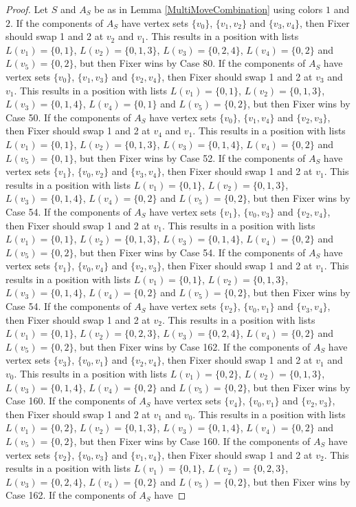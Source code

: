 \documentclass[12pt]{amsart}
\theoremstyle{plain}
\theoremstyle{definition}
\theoremstyle{remark}
\begin{document}
\begin{proof}
Let $S$ and $A_S$ be as in Lemma \ref{MultiMoveCombination} using colors $1$ and $2$. If the components of $A_S$ have vertex sets $\{v_0\}$, $\{v_1, v_2\}$ and $\{v_3, v_4\}$, then Fixer should swap 1 and 2 at $v_2$ and $v_1$. This results in a position with lists $L(v_1) = \{0, 1\}$, $L(v_2) = \{0, 1, 3\}$, $L(v_3) = \{0, 2, 4\}$, $L(v_4) = \{0, 2\}$ and $L(v_5) = \{0, 2\}$, but then Fixer wins by Case 80. If the components of $A_S$ have vertex sets $\{v_0\}$, $\{v_1, v_3\}$ and $\{v_2, v_4\}$, then Fixer should swap 1 and 2 at $v_3$ and $v_1$. This results in a position with lists $L(v_1) = \{0, 1\}$, $L(v_2) = \{0, 1, 3\}$, $L(v_3) = \{0, 1, 4\}$, $L(v_4) = \{0, 1\}$ and $L(v_5) = \{0, 2\}$, but then Fixer wins by Case 50. If the components of $A_S$ have vertex sets $\{v_0\}$, $\{v_1, v_4\}$ and $\{v_2, v_3\}$, then Fixer should swap 1 and 2 at $v_4$ and $v_1$. This results in a position with lists $L(v_1) = \{0, 1\}$, $L(v_2) = \{0, 1, 3\}$, $L(v_3) = \{0, 1, 4\}$, $L(v_4) = \{0, 2\}$ and $L(v_5) = \{0, 1\}$, but then Fixer wins by Case 52. If the components of $A_S$ have vertex sets $\{v_1\}$, $\{v_0, v_2\}$ and $\{v_3, v_4\}$, then Fixer should swap 1 and 2 at $v_1$. This results in a position with lists $L(v_1) = \{0, 1\}$, $L(v_2) = \{0, 1, 3\}$, $L(v_3) = \{0, 1, 4\}$, $L(v_4) = \{0, 2\}$ and $L(v_5) = \{0, 2\}$, but then Fixer wins by Case 54. If the components of $A_S$ have vertex sets $\{v_1\}$, $\{v_0, v_3\}$ and $\{v_2, v_4\}$, then Fixer should swap 1 and 2 at $v_1$. This results in a position with lists $L(v_1) = \{0, 1\}$, $L(v_2) = \{0, 1, 3\}$, $L(v_3) = \{0, 1, 4\}$, $L(v_4) = \{0, 2\}$ and $L(v_5) = \{0, 2\}$, but then Fixer wins by Case 54. If the components of $A_S$ have vertex sets $\{v_1\}$, $\{v_0, v_4\}$ and $\{v_2, v_3\}$, then Fixer should swap 1 and 2 at $v_1$. This results in a position with lists $L(v_1) = \{0, 1\}$, $L(v_2) = \{0, 1, 3\}$, $L(v_3) = \{0, 1, 4\}$, $L(v_4) = \{0, 2\}$ and $L(v_5) = \{0, 2\}$, but then Fixer wins by Case 54. If the components of $A_S$ have vertex sets $\{v_2\}$, $\{v_0, v_1\}$ and $\{v_3, v_4\}$, then Fixer should swap 1 and 2 at $v_2$. This results in a position with lists $L(v_1) = \{0, 1\}$, $L(v_2) = \{0, 2, 3\}$, $L(v_3) = \{0, 2, 4\}$, $L(v_4) = \{0, 2\}$ and $L(v_5) = \{0, 2\}$, but then Fixer wins by Case 162. If the components of $A_S$ have vertex sets $\{v_3\}$, $\{v_0, v_1\}$ and $\{v_2, v_4\}$, then Fixer should swap 1 and 2 at $v_1$ and $v_0$. This results in a position with lists $L(v_1) = \{0, 2\}$, $L(v_2) = \{0, 1, 3\}$, $L(v_3) = \{0, 1, 4\}$, $L(v_4) = \{0, 2\}$ and $L(v_5) = \{0, 2\}$, but then Fixer wins by Case 160. If the components of $A_S$ have vertex sets $\{v_4\}$, $\{v_0, v_1\}$ and $\{v_2, v_3\}$, then Fixer should swap 1 and 2 at $v_1$ and $v_0$. This results in a position with lists $L(v_1) = \{0, 2\}$, $L(v_2) = \{0, 1, 3\}$, $L(v_3) = \{0, 1, 4\}$, $L(v_4) = \{0, 2\}$ and $L(v_5) = \{0, 2\}$, but then Fixer wins by Case 160. If the components of $A_S$ have vertex sets $\{v_2\}$, $\{v_0, v_3\}$ and $\{v_1, v_4\}$, then Fixer should swap 1 and 2 at $v_2$. This results in a position with lists $L(v_1) = \{0, 1\}$, $L(v_2) = \{0, 2, 3\}$, $L(v_3) = \{0, 2, 4\}$, $L(v_4) = \{0, 2\}$ and $L(v_5) = \{0, 2\}$, but then Fixer wins by Case 162. If the components of $A_S$ have 
\end{proof}
\end{document}

